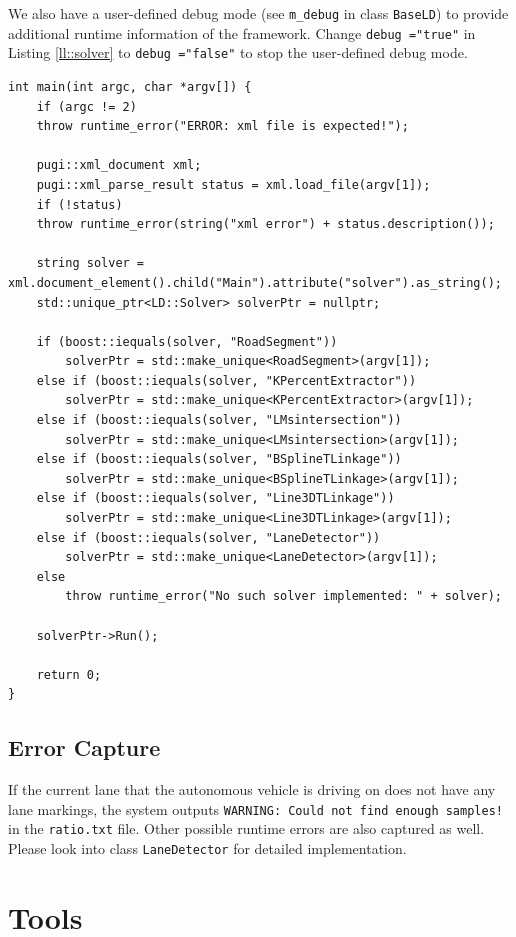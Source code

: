 \documentclass[a4paper]{article}
\begin{document}
We also have a user-defined debug mode (see \verb+m_debug+ in class \verb+BaseLD+) to provide additional runtime information of the framework. Change \verb+debug ="true"+ in Listing \ref{ll::solver} to \verb+debug ="false"+ to stop the user-defined debug mode. 

\begin{lstlisting}[float,  label=ll::maincpp, caption =  Parse Parameter.xml to execute  different functionality in main.cpp.]
int main(int argc, char *argv[]) {
	if (argc != 2)
	throw runtime_error("ERROR: xml file is expected!");
	
	pugi::xml_document xml;
	pugi::xml_parse_result status = xml.load_file(argv[1]);
	if (!status)
	throw runtime_error(string("xml error") + status.description());
	
	string solver = xml.document_element().child("Main").attribute("solver").as_string();
	std::unique_ptr<LD::Solver> solverPtr = nullptr;
	
	if (boost::iequals(solver, "RoadSegment"))
		solverPtr = std::make_unique<RoadSegment>(argv[1]);
	else if (boost::iequals(solver, "KPercentExtractor"))
		solverPtr = std::make_unique<KPercentExtractor>(argv[1]);
	else if (boost::iequals(solver, "LMsintersection"))
		solverPtr = std::make_unique<LMsintersection>(argv[1]);
	else if (boost::iequals(solver, "BSplineTLinkage"))
		solverPtr = std::make_unique<BSplineTLinkage>(argv[1]);
	else if (boost::iequals(solver, "Line3DTLinkage"))
		solverPtr = std::make_unique<Line3DTLinkage>(argv[1]);
	else if (boost::iequals(solver, "LaneDetector"))
		solverPtr = std::make_unique<LaneDetector>(argv[1]);
	else
		throw runtime_error("No such solver implemented: " + solver);
	
	solverPtr->Run();
	
	return 0;
}
\end{lstlisting}

\subsection{Error Capture}
If the current lane that the autonomous vehicle is driving on does not have any lane markings, the system  outputs \verb+WARNING: Could not find enough samples!+ in the \verb+ratio.txt+ file.  Other possible runtime errors are also captured as well.  Please look into class \verb+LaneDetector+ for detailed implementation.


\section{Tools}
\end{document}
